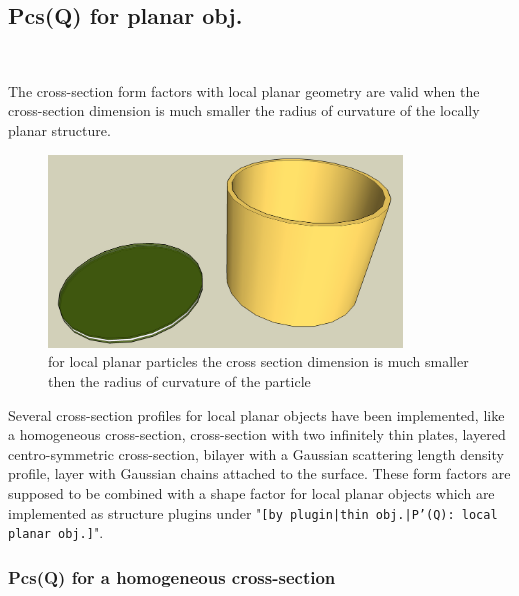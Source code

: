 \clearpage
\subsection{Pcs(Q) for planar obj.} ~\\
\label{plugin:Pcs4planar}

The cross-section form factors with local planar geometry are valid
when the cross-section dimension is much smaller the radius of curvature
of the locally planar structure.
\begin{figure}[htb]
\begin{center}
\includegraphics[width=0.838\textwidth,height=0.456\textwidth]{../images/form_factor/anisotropic/localplanar.png}
\end{center}
\caption{for local planar particles the cross section dimension is much smaller then the
radius of curvature of the particle}
\label{fig:localplanar}
\end{figure}

Several cross-section profiles for local planar objects have been implemented,
like a homogeneous cross-section,
cross-section with two infinitely thin plates,
layered centro-symmetric cross-section,
bilayer with a Gaussian scattering length density profile,
layer with Gaussian chains attached to the surface.
These form factors are supposed to be combined with a shape factor for
local planar objects which are implemented as structure  plugins
under "\texttt{[by plugin|thin obj.|P'(Q): local planar
obj.]}".

\clearpage

\subsubsection{Pcs(Q) for a homogeneous cross-section}
\label{plugin:Pcs:homogeneousXS} ~\\

